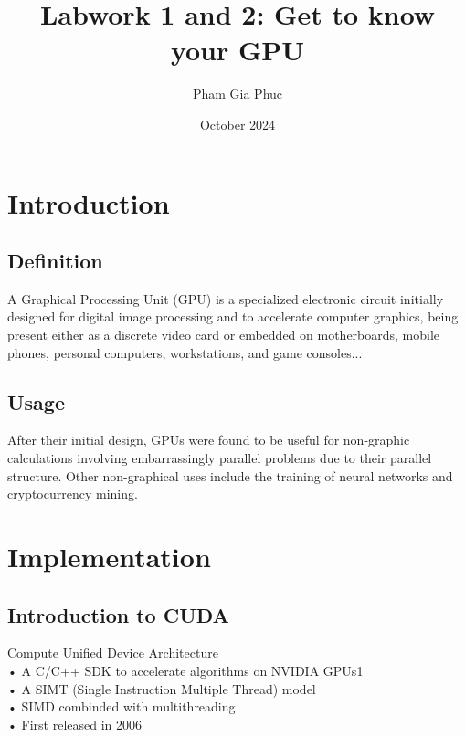 \documentclass{article}
\title{Labwork 1 and 2: Get to know your GPU}
\author{Pham Gia Phuc}
\date{October 2024}
\begin{document}
\maketitle

\setlength\parindent{0pt}

\section{Introduction}

    \subsection{Definition}

    A Graphical Processing Unit (GPU) is a specialized electronic circuit initially designed for digital image processing and to accelerate computer graphics, being present either as a discrete video card or embedded on motherboards, mobile phones, personal computers, workstations, and game consoles...
    
    \subsection{Usage}

    After their initial design, GPUs were found to be useful for non-graphic calculations involving embarrassingly parallel problems due to their parallel structure. Other non-graphical uses include the training of neural networks and cryptocurrency mining.
    
    
\section{Implementation}

    \subsection{Introduction to CUDA}

        Compute Unified Device Architecture \\
        • A C/C++ SDK to accelerate algorithms on NVIDIA GPUs1 \\
        • A SIMT (Single Instruction Multiple Thread) model \\
        • SIMD combinded with multithreading \\
        • First released in 2006 \\
\end{document}

